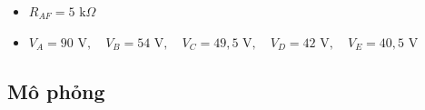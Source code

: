 \begin{dapsobox}
  \begin{itemize}[leftmargin=1.5em]
    \item $R_{AF} = 5\text{ k}\Omega$
    \item $V_A = 90\text{ V}, \quad V_B = 54\text{ V}, \quad V_C = 49{,}5\text{ V}, \quad V_D = 42\text{ V}, \quad V_E = 40{,}5\text{ V}$
  \end{itemize}
\end{dapsobox}

\subsection{Mô phỏng}
\simresult
{}
